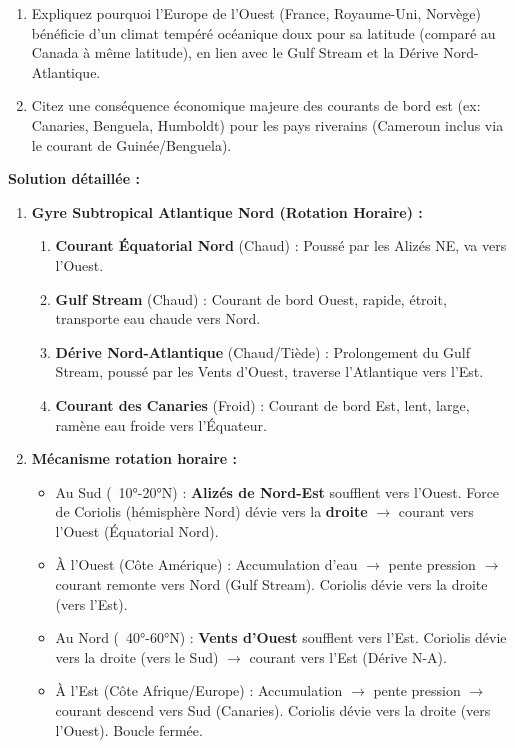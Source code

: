 \documentclass[11pt]{article}
\begin{document}
\begin{exoresolu}
\begin{enumerate}
    \item Expliquez pourquoi l'Europe de l'Ouest (France, Royaume-Uni, Norvège) bénéficie d'un climat tempéré océanique doux pour sa latitude (comparé au Canada à même latitude), en lien avec le Gulf Stream et la Dérive Nord-Atlantique.
    \item Citez une conséquence économique majeure des courants de bord est (ex: Canaries, Benguela, Humboldt) pour les pays riverains (Cameroun inclus via le courant de Guinée/Benguela).
\end{enumerate}
\tcblower
\textbf{Solution détaillée :}
\begin{enumerate}
    \item \textbf{Gyre Subtropical Atlantique Nord (Rotation Horaire) :}
          \begin{enumerate}
              \item \textbf{Courant Équatorial Nord} (Chaud) : Poussé par les Alizés NE, va vers l'Ouest.
              \item \textbf{Gulf Stream} (Chaud) : Courant de bord Ouest, rapide, étroit, transporte eau chaude vers Nord.
              \item \textbf{Dérive Nord-Atlantique} (Chaud/Tiède) : Prolongement du Gulf Stream, poussé par les Vents d'Ouest, traverse l'Atlantique vers l'Est.
              \item \textbf{Courant des Canaries} (Froid) : Courant de bord Est, lent, large, ramène eau froide vers l'Équateur.
          \end{enumerate}
    \item \textbf{Mécanisme rotation horaire :}
          \begin{itemize}
              \item Au Sud (~10°-20°N) : \textbf{Alizés de Nord-Est} soufflent vers l'Ouest. Force de Coriolis (hémisphère Nord) dévie vers la \textbf{droite} $\rightarrow$ courant vers l'Ouest (Équatorial Nord).
              \item À l'Ouest (Côte Amérique) : Accumulation d'eau $\rightarrow$ pente pression $\rightarrow$ courant remonte vers Nord (Gulf Stream). Coriolis dévie vers la droite (vers l'Est).
              \item Au Nord (~40°-60°N) : \textbf{Vents d'Ouest} soufflent vers l'Est. Coriolis dévie vers la droite (vers le Sud) $\rightarrow$ courant vers l'Est (Dérive N-A).
              \item À l'Est (Côte Afrique/Europe) : Accumulation $\rightarrow$ pente pression $\rightarrow$ courant descend vers Sud (Canaries). Coriolis dévie vers la droite (vers l'Ouest). Boucle fermée.

\end{itemize}
\end{enumerate}
\end{exoresolu}
\end{document}
